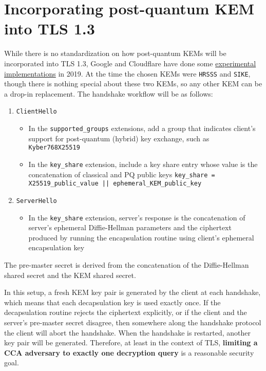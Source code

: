 \documentclass{article}
\begin{document}
\section{Incorporating post-quantum KEM into TLS 1.3}
While there is no standardization on how post-quantum KEMs will be incorporated into TLS 1.3, Google and Cloudflare have done some \href{https://blog.cloudflare.com/the-tls-post-quantum-experiment/}{experimental implementations} in 2019. At the time the chosen KEMs were \texttt{HRSSS} and \texttt{SIKE}, though there is nothing special about these two KEMs, so any other KEM can be a drop-in replacement. The handshake workflow will be as follows:

\begin{enumerate}
    \item \texttt{ClientHello} \begin{itemize}
        \item In the \texttt{supported\_groups} extensions, add a group that indicates client's support for post-quantum (hybrid) key exchange, such as \texttt{Kyber768X25519}
        \item In the \texttt{key\_share} extension, include a key share entry whose value is the concatenation of classical and PQ public keys \texttt{key\_share = X25519\_public\_value || ephemeral\_KEM\_public\_key}
    \end{itemize}

    \item \texttt{ServerHello} \begin{itemize}
        \item In the \texttt{key\_share} extension, server's response is the concatenation of server's ephemeral Diffie-Hellman parameters and the ciphertext produced by running the encapsulation routine using client's ephemeral encapsulation key
    \end{itemize}
\end{enumerate}

The pre-master secret is derived from the concatenation of the Diffie-Hellman shared secret and the KEM shared secret.

In this setup, a fresh KEM key pair is generated by the client at each handshake, which means that each decapsulation key is used exactly once. If the decapsulation routine rejects the ciphertext explicitly, or if the client and the server's pre-master secret disagree, then somewhere along the handshake protocol the client will abort the handshake. When the handshake is restarted, another key pair will be generated. Therefore, at least in the context of TLS, \textbf{limiting a CCA adversary to exactly one decryption query} is a reasonable security goal.
\end{document}
